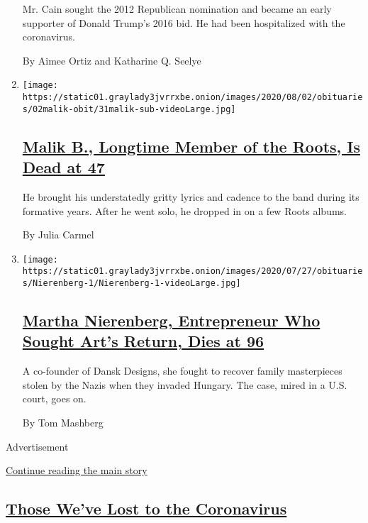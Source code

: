\begin{enumerate}
  Mr. Cain sought the 2012 Republican nomination and became an early
  supporter of Donald Trump's 2016 bid. He had been hospitalized with
  the coronavirus.

  By Aimee Ortiz and Katharine Q. Seelye
\item
  \texttt{[image: https://static01.graylady3jvrrxbe.onion/images/2020/08/02/obituaries/02malik-obit/31malik-sub-videoLarge.jpg]}

  \hypertarget{malik-b-longtime-member-of-the-roots-is-dead-at-47}{%
  \subsection{\texorpdfstring{\href{/2020/07/31/arts/music/malik-b-dead.html}{Malik
  B., Longtime Member of the Roots, Is Dead at
  47}}{Malik B., Longtime Member of the Roots, Is Dead at 47}}\label{malik-b-longtime-member-of-the-roots-is-dead-at-47}}

  He brought his understatedly gritty lyrics and cadence to the band
  during its formative years. After he went solo, he dropped in on a few
  Roots albums.

  By Julia Carmel
\item
  \texttt{[image: https://static01.graylady3jvrrxbe.onion/images/2020/07/27/obituaries/Nierenberg-1/Nierenberg-1-videoLarge.jpg]}

  \hypertarget{martha-nierenberg-entrepreneur-who-sought-arts-return-dies-at-96}{%
  \subsection{\texorpdfstring{\href{/2020/07/30/arts/martha-nierenberg-entrepreneur-who-sought-arts-return-dies-at-96.html}{Martha
  Nierenberg, Entrepreneur Who Sought Art's Return, Dies at
  96}}{Martha Nierenberg, Entrepreneur Who Sought Art's Return, Dies at 96}}\label{martha-nierenberg-entrepreneur-who-sought-arts-return-dies-at-96}}

  A co-founder of Dansk Designs, she fought to recover family
  masterpieces stolen by the Nazis when they invaded Hungary. The case,
  mired in a U.S. court, goes on.

  By Tom Mashberg
\end{enumerate}

Advertisement

\protect\hyperlink{after-mid1}{Continue reading the main story}

\hypertarget{those-weve-lost-to-the-coronavirus}{%
\subsection{\texorpdfstring{\href{/series/people-died-coronavirus-obituaries}{Those
We've Lost to the
Coronavirus}}{Those We've Lost to the Coronavirus}}\label{those-weve-lost-to-the-coronavirus}}

